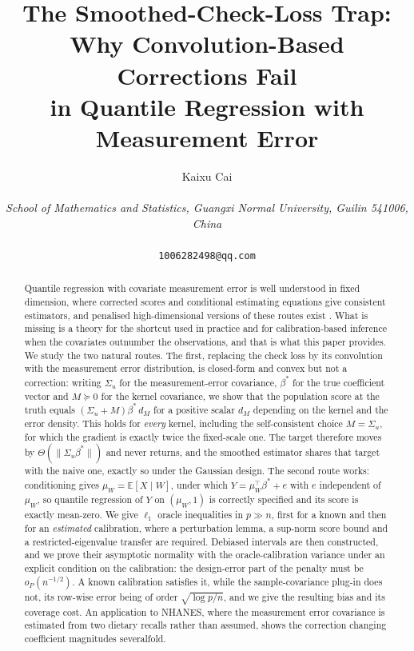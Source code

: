 \documentclass[12pt,a4paper]{article}
\theoremstyle{definition}
\theoremstyle{remark}
\newcommand{\E}{\mathbb{E}}
\newcommand{\norm}[1]{\|#1\|}
\newcommand{\betas}{\beta^*}
\newcommand{\muv}{\mu_W}
\begin{document}
\title{The Smoothed-Check-Loss Trap: \\ Why Convolution-Based Corrections Fail \\ in
Quantile Regression with Measurement Error}

\author{Kaixu Cai \\[2pt]
\parbox{0.82\textwidth}{\centering\itshape School of Mathematics and Statistics,
Guangxi Normal University, Guilin 541006, China} \\[2pt]
\texttt{1006282498@qq.com}}

\date{}

\maketitle

\begin{abstract}
Quantile regression with covariate measurement error is well understood in fixed
dimension, where corrected scores \citep{stefanski1989,nakamura1990,wang2012correctedloss}
and conditional estimating equations \citep{wei2009quantile} give consistent estimators,
and penalised high-dimensional versions of these routes exist
\citep{kaul2015weighted,bai2021variable,ma2022highdim}. What is missing is a theory for the
shortcut used in practice and for calibration-based inference when the covariates outnumber
the observations, and that is what this paper provides. We study
the two natural routes. The first, replacing the check loss by its convolution with the
measurement error distribution, is closed-form and convex but not a correction: writing
$\Sigma_u$ for the measurement-error covariance, $\betas$ for the true coefficient vector
and $M\succeq0$ for the kernel covariance, we show that the population score at the truth
equals $(\Sigma_u+M)\betas\,d_M$ for a positive scalar $d_M$ depending on the kernel and
the error density. This holds for \emph{every} kernel, including the self-consistent choice
$M=\Sigma_u$, for which the gradient is exactly twice the fixed-scale one. The target therefore moves by
$\Theta(\norm{\Sigma_u\betas})$ and never returns, and the smoothed estimator shares that
target with the naive one, exactly so under the Gaussian design. The second route works: conditioning gives
$\muv=\E[X\mid W]$, under which $Y=\muv^\top\betas+e$ with $e$ independent of $\muv$, so
quantile regression of $Y$ on $(\muv,1)$ is correctly specified and its score is exactly
mean-zero. We give $\ell_1$ oracle inequalities in $p\gg n$, first for a known and then for
an \emph{estimated} calibration, where a perturbation lemma, a sup-norm score bound and a
restricted-eigenvalue transfer are required. Debiased intervals are then constructed, and we
prove their asymptotic normality with the oracle-calibration variance under an explicit
condition on the calibration: the design-error part of the penalty must be $o_P(n^{-1/2})$.
A known calibration satisfies it, while the sample-covariance plug-in does not, its row-wise
error being of order $\sqrt{\log p/n}$, and we give the resulting bias and its coverage cost.
An application to NHANES, where the measurement error covariance is
estimated from two dietary recalls rather than assumed, shows the correction changing
coefficient magnitudes severalfold.
\end{abstract}
\end{document}
